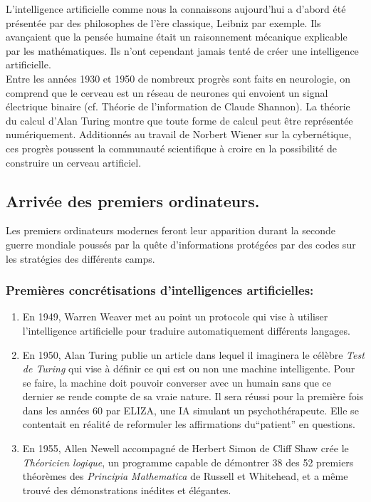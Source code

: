 \documentclass[a4paper, 12pt]{article}
\numberwithin{equation}{subsection}
\begin{document}
L'intelligence artificielle comme nous la connaissons aujourd'hui a d'abord été présentée par des philosophes de l'ère classique, Leibniz par exemple. Ils avançaient que la pensée humaine était un raisonnement mécanique explicable par les mathématiques. Ils n'ont cependant jamais tenté de créer une intelligence artificielle.\\

Entre les années 1930 et 1950 de nombreux progrès sont faits en neurologie, on comprend que le cerveau est un réseau de neurones qui envoient un signal électrique binaire (cf. Théorie de l'information de Claude Shannon). La théorie du calcul d'Alan Turing montre que toute forme de calcul peut être représentée numériquement. Additionnés au travail de Norbert Wiener sur la cybernétique, ces progrès poussent la communauté scientifique à croire en la possibilité de construire un cerveau artificiel.
\subsection{Arrivée des premiers ordinateurs.}
Les premiers ordinateurs modernes feront leur apparition durant la seconde guerre mondiale poussés par la quête d'informations protégées par des codes sur les stratégies des différents camps.
\subsubsection{Premières concrétisations d'intelligences artificielles:}
\begin{enumerate}
  \item En 1949, Warren Weaver met au point un protocole qui vise à utiliser l'intelligence artificielle pour traduire automatiquement différents langages.
  \item En 1950, Alan Turing publie un article dans lequel il imaginera le célèbre \textit{Test de Turing} qui vise à définir ce qui est ou non une machine intelligente. Pour se faire, la machine doit pouvoir converser avec un humain sans que ce dernier se rende compte de sa vraie nature. Il sera réussi pour la première fois dans les années 60 par ELIZA, une IA simulant un psychothérapeute. Elle se contentait en réalité de reformuler les affirmations du``patient'' en questions.
  \item En 1955, Allen Newell accompagné de Herbert Simon de Cliff Shaw crée le \textit{Théoricien logique}, un programme capable de démontrer 38 des 52 premiers théorèmes des \textit{Principia Mathematica} de Russell et Whitehead, et a même trouvé des démonstrations inédites et élégantes.
\end{enumerate}
\end{document}
